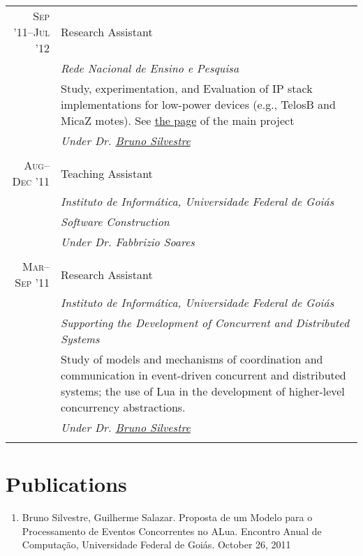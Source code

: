 \documentclass[a4paper,10pt]{article}
\begin{document}
\begin{tabular}{r|p{11cm}}
  \textsc{Sep '11--Jul '12}
  & Research Assistant \\
  &\emph{Rede Nacional de Ensino e Pesquisa}\\
  &\footnotesize{Study, experimentation, and Evaluation of IP stack implementations 
  for low-power devices (e.g., TelosB and MicaZ motes). See 
            \href{http://www.nr2.ufpr.br/cia2/}{the page} of the main project}\\
  &\emph{Under Dr. \href{http://inf.ufg.br/~brunoos/}{Bruno Silvestre}}
  \\\multicolumn{2}{c}{} \\

  \textsc{Aug--Dec '11}
  & Teaching Assistant \\
  &\emph{Instituto de Informática, Universidade Federal de Goiás}\\
  &\emph{\footnotesize{Software Construction}} \\
  &\emph{Under Dr. Fabbrizio Soares}
  \\\multicolumn{2}{c}{} \\

  \textsc{Mar--Sep '11}
  & Research Assistant \\
  &\emph{Instituto de Informática, Universidade Federal de Goiás}\\
  &\emph{Supporting the Development of Concurrent and Distributed Systems}\\
  &\indent \footnotesize{Study of models and mechanisms of coordination and 
        communication in event-driven concurrent and distributed systems; the 
        use of Lua in the development of higher-level concurrency abstractions.}\\
  &\emph{Under Dr. \href{http://inf.ufg.br/~brunoos/}{Bruno Silvestre}}
  \\\multicolumn{2}{c}{} \\

\end{tabular}

\section{Publications}
\begin{enumerate}
  \renewcommand{\labelenumi}{[\arabic{enumi}] }
  \item Bruno Silvestre, Guilherme Salazar. Proposta de um Modelo para o
        Processamento de Eventos Concorrentes no ALua. Encontro Anual de
        Computação, Universidade Federal de Goiás. October 26, 2011 \\
\end{enumerate}
\end{document}
